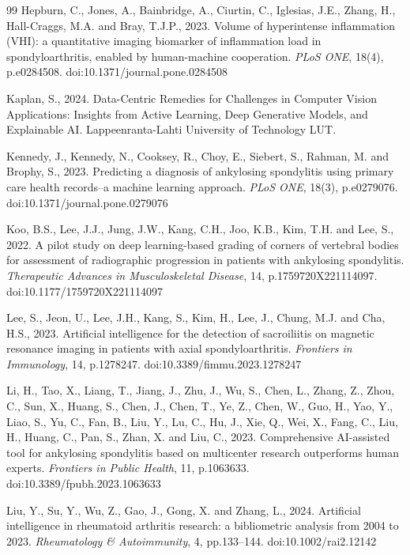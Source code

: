 \documentclass[12pt, a4paper]{article}
\begin{document}
\begin{thebibliography}{99}
Hepburn, C., Jones, A., Bainbridge, A., Ciurtin, C., Iglesias, J.E., Zhang, H., Hall-Craggs, M.A. and Bray, T.J.P., 2023. Volume of hyperintense inflammation (VHI): a quantitative imaging biomarker of inflammation load in spondyloarthritis, enabled by human-machine cooperation. \textit{PLoS ONE}, 18(4), p.e0284508. doi:10.1371/journal.pone.0284508



Kaplan, S., 2024. Data-Centric Remedies for Challenges in Computer Vision Applications: Insights from Active Learning, Deep Generative Models, and Explainable AI. Lappeenranta-Lahti University of Technology LUT.

Kennedy, J., Kennedy, N., Cooksey, R., Choy, E., Siebert, S., Rahman, M. and Brophy, S., 2023. Predicting a diagnosis of ankylosing spondylitis using primary care health records--a machine learning approach. \textit{PLoS ONE}, 18(3), p.e0279076. doi:10.1371/journal.pone.0279076

Koo, B.S., Lee, J.J., Jung, J.W., Kang, C.H., Joo, K.B., Kim, T.H. and Lee, S., 2022. A pilot study on deep learning-based grading of corners of vertebral bodies for assessment of radiographic progression in patients with ankylosing spondylitis. \textit{Therapeutic Advances in Musculoskeletal Disease}, 14, p.1759720X221114097. doi:10.1177/1759720X221114097

Lee, S., Jeon, U., Lee, J.H., Kang, S., Kim, H., Lee, J., Chung, M.J. and Cha, H.S., 2023. Artificial intelligence for the detection of sacroiliitis on magnetic resonance imaging in patients with axial spondyloarthritis. \textit{Frontiers in Immunology}, 14, p.1278247. doi:10.3389/fimmu.2023.1278247

Li, H., Tao, X., Liang, T., Jiang, J., Zhu, J., Wu, S., Chen, L., Zhang, Z., Zhou, C., Sun, X., Huang, S., Chen, J., Chen, T., Ye, Z., Chen, W., Guo, H., Yao, Y., Liao, S., Yu, C., Fan, B., Liu, Y., Lu, C., Hu, J., Xie, Q., Wei, X., Fang, C., Liu, H., Huang, C., Pan, S., Zhan, X. and Liu, C., 2023. Comprehensive AI-assisted tool for ankylosing spondylitis based on multicenter research outperforms human experts. \textit{Frontiers in Public Health}, 11, p.1063633. doi:10.3389/fpubh.2023.1063633

Liu, Y., Su, Y., Wu, Z., Gao, J., Gong, X. and Zhang, L., 2024. Artificial intelligence in rheumatoid arthritis research: a bibliometric analysis from 2004 to 2023. \textit{Rheumatology \& Autoimmunity}, 4, pp.133--144. doi:10.1002/rai2.12142



\end{thebibliography}
\end{document}
